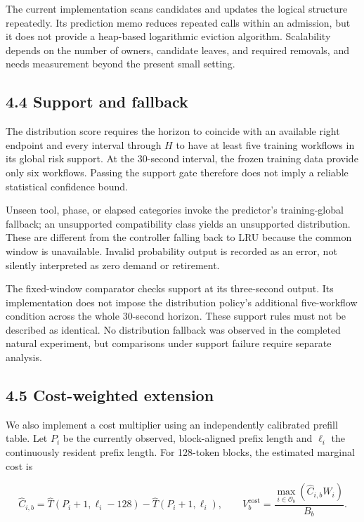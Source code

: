 \documentclass[
  english,
  10pt,
]{article}
\begin{document}
The current implementation scans candidates and updates the logical
structure repeatedly. Its prediction memo reduces repeated calls within
an admission, but it does not provide a heap-based logarithmic eviction
algorithm. Scalability depends on the number of owners, candidate
leaves, and required removals, and needs measurement beyond the present
small setting.

\subsection{4.4 Support and fallback}\label{support-and-fallback}

The distribution score requires the horizon to coincide with an
available right endpoint and every interval through \(H\) to have at
least five training workflows in its global risk support. At the
30-second interval, the frozen training data provide only six workflows.
Passing the support gate therefore does not imply a reliable statistical
confidence bound.

Unseen tool, phase, or elapsed categories invoke the predictor's
training-global fallback; an unsupported compatibility class yields an
unsupported distribution. These are different from the controller
falling back to LRU because the common window is unavailable. Invalid
probability output is recorded as an error, not silently interpreted as
zero demand or retirement.

The fixed-window comparator checks support at its three-second output.
Its implementation does not impose the distribution policy's additional
five-workflow condition across the whole 30-second horizon. These
support rules must not be described as identical. No distribution
fallback was observed in the completed natural experiment, but
comparisons under support failure require separate analysis.

\subsection{4.5 Cost-weighted extension}\label{cost-weighted-extension}

We also implement a cost multiplier using an independently calibrated
prefill table. Let \(P_i\) be the currently observed, block-aligned
prefix length and \(\ell_i\) the continuously resident prefix length.
For 128-token blocks, the estimated marginal cost is

\[
\widehat C_{i,b}=\widehat T(P_i+1,\ell_i-128)
 -\widehat T(P_i+1,\ell_i),
\qquad
V_b^{\mathrm{cost}}=\frac{\max_{i\in\mathcal O_b}
 (\widehat C_{i,b}W_i)}{B_b}.
\]
\end{document}

